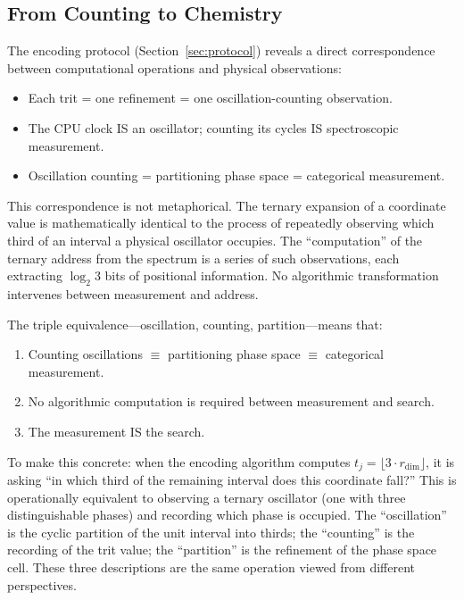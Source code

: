 \documentclass[11pt,a4paper]{article}
\theoremstyle{definition}
\theoremstyle{remark}
\begin{document}
\subsection{From Counting to Chemistry}

The encoding protocol (Section~\ref{sec:protocol}) reveals a direct correspondence between computational operations and physical observations:

\begin{itemize}[nosep]
\item Each trit = one refinement = one oscillation-counting observation.
\item The CPU clock IS an oscillator; counting its cycles IS spectroscopic measurement.
\item Oscillation counting = partitioning phase space = categorical measurement.
\end{itemize}

This correspondence is not metaphorical. The ternary expansion of a coordinate value is mathematically identical to the process of repeatedly observing which third of an interval a physical oscillator occupies. The ``computation'' of the ternary address from the spectrum is a series of such observations, each extracting $\log_2 3$ bits of positional information. No algorithmic transformation intervenes between measurement and address.

The triple equivalence---oscillation, counting, partition---means that:

\begin{enumerate}[nosep]
\item Counting oscillations $\equiv$ partitioning phase space $\equiv$ categorical measurement.
\item No algorithmic computation is required between measurement and search.
\item The measurement IS the search.
\end{enumerate}

To make this concrete: when the encoding algorithm computes $t_j = \lfloor 3 \cdot r_{\mathrm{dim}} \rfloor$, it is asking ``in which third of the remaining interval does this coordinate fall?'' This is operationally equivalent to observing a ternary oscillator (one with three distinguishable phases) and recording which phase is occupied. The ``oscillation'' is the cyclic partition of the unit interval into thirds; the ``counting'' is the recording of the trit value; the ``partition'' is the refinement of the phase space cell. These three descriptions are the same operation viewed from different perspectives.
\end{document}
